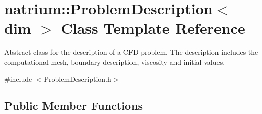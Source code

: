 \hypertarget{classnatrium_1_1ProblemDescription}{\section{natrium\-:\-:Problem\-Description$<$ dim $>$ Class Template Reference}
\label{classnatrium_1_1ProblemDescription}
}


Abstract class for the description of a C\-F\-D problem. The description includes the computational mesh, boundary description, viscosity and initial values.  




{\ttfamily \#include $<$Problem\-Description.\-h$>$}

\subsection*{Public Member Functions}
